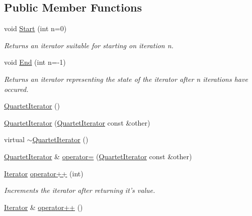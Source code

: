 \subsection*{Public Member Functions}
\begin{DoxyCompactItemize}
\item 
void \hyperlink{classJKBuilder_1_1QuartetIterator_a34ca36a99b20ae3170babadaffe51ed2}{Start} (int n=0)
\begin{DoxyCompactList}\small\item\em Returns an iterator suitable for starting on iteration n. \item\end{DoxyCompactList}\item 
void \hyperlink{classJKBuilder_1_1QuartetIterator_a5f692b73d2e160450f4617bb75825e11}{End} (int n=-\/1)
\begin{DoxyCompactList}\small\item\em Returns an iterator representing the state of the iterator after n iterations have occured. \item\end{DoxyCompactList}\item 
\hyperlink{classJKBuilder_1_1QuartetIterator_a07d00ea07b0f26457f2552be518080ba}{QuartetIterator} ()
\item 
\hyperlink{classJKBuilder_1_1QuartetIterator_af4c9d6672dc0009768dd792e7f98ae7d}{QuartetIterator} (\hyperlink{classJKBuilder_1_1QuartetIterator}{QuartetIterator} const \&other)
\item 
virtual \hyperlink{classJKBuilder_1_1QuartetIterator_a45af941f47c9b8051f2ed69d47157e12}{$\sim$QuartetIterator} ()
\item 
\hyperlink{classJKBuilder_1_1QuartetIterator}{QuartetIterator} \& \hyperlink{classJKBuilder_1_1QuartetIterator_ab3cd17222545586596dbbc6aa3ca7046}{operator=} (\hyperlink{classJKBuilder_1_1QuartetIterator}{QuartetIterator} const \&other)
\item 
\hyperlink{classJKBuilder_1_1Iterator}{Iterator} \hyperlink{classJKBuilder_1_1Iterator_ac1702aedba13b4112b891b58dfd78eba}{operator++} (int)
\begin{DoxyCompactList}\small\item\em Increments the iterator after returning it's value. \item\end{DoxyCompactList}\item 
\hyperlink{classJKBuilder_1_1Iterator}{Iterator} \& \hyperlink{classJKBuilder_1_1Iterator_ae1f21c74128a5ef5d1b9de72ceb09be8}{operator++} ()

\end{DoxyCompactItemize}
